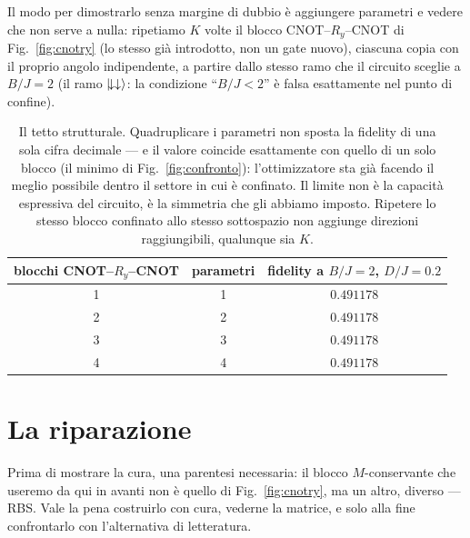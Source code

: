 \documentclass[11pt,a4paper]{article}
\begin{document}
Il modo per dimostrarlo senza margine di dubbio è aggiungere parametri e vedere
che non serve a nulla: ripetiamo $K$ volte il blocco CNOT--$R_y$--CNOT di
Fig.~\ref{fig:cnotry} (lo stesso già introdotto, non un gate nuovo), ciascuna
copia con il proprio angolo indipendente, a partire dallo stesso ramo che il
circuito sceglie a $B/J=2$ (il ramo $\lvert \!\downarrow\downarrow\rangle$: la
condizione ``$B/J<2$'' è falsa esattamente nel punto di confine).

\begin{table}[htbp]
\centering
\small
\renewcommand{\arraystretch}{1.3}
\begin{tabular}{@{}ccc@{}}
\toprule
\rowcolor{grigetto}
\textbf{blocchi CNOT--$R_y$--CNOT} & \textbf{parametri} & \textbf{fidelity a $B/J=2$, $D/J=0.2$} \\
\midrule
1 & 1 & $0.491178$ \\
2 & 2 & $0.491178$ \\
3 & 3 & $0.491178$ \\
4 & 4 & $0.491178$ \\
\bottomrule
\end{tabular}
\caption{Il tetto strutturale. Quadruplicare i parametri non sposta la fidelity
di una sola cifra decimale --- e il valore coincide esattamente con quello di
un solo blocco (il minimo di Fig.~\ref{fig:confronto}): l'ottimizzatore sta già
facendo il meglio possibile dentro il settore in cui è confinato. Il limite non
è la capacità espressiva del circuito, è la simmetria che gli abbiamo imposto.
Ripetere lo stesso blocco confinato allo stesso sottospazio non aggiunge
direzioni raggiungibili, qualunque sia $K$.}
\label{tab:tetto}
\end{table}

\FloatBarrier


\section{La riparazione}
\label{sec:riparazione}
\label{sec:rbs-vs-w}

Prima di mostrare la cura, una parentesi necessaria: il blocco $M$-conservante
che useremo da qui in avanti non è quello di Fig.~\ref{fig:cnotry}, ma un altro,
diverso --- RBS. Vale la pena costruirlo con cura, vederne la matrice, e solo
alla fine confrontarlo con l'alternativa di letteratura.
\end{document}
